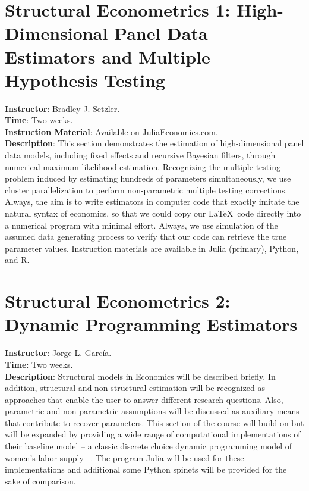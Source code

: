 \section{Structural Econometrics 1: High-Dimensional Panel Data Estimators and Multiple Hypothesis Testing}
\noindent \textbf{Instructor}: Bradley J. Setzler.\\
\noindent \textbf{Time}: Two weeks.\\
\noindent \textbf{Instruction Material}: Available on JuliaEconomics.com.\\
\noindent \textbf{Description}: This section demonstrates the estimation of high-dimensional panel data models, including fixed effects and recursive Bayesian filters, through numerical maximum likelihood estimation. Recognizing the multiple testing problem induced by estimating hundreds of parameters simultaneously, we use cluster parallelization to perform non-parametric multiple testing corrections. Always, the aim is to write estimators in computer code that exactly imitate the natural syntax of economics, so that we could copy our \LaTeX\ code directly into a numerical program with minimal effort. Always, we use simulation of the assumed data generating process to verify that our code can retrieve the true parameter values. Instruction materials are available in Julia (primary), Python, and R.


\section{Structural Econometrics 2: Dynamic Programming Estimators}
\noindent \textbf{Instructor}: Jorge L. Garc\'{i}a.\\
\noindent \textbf{Time}: Two weeks.\\
\noindent \textbf{Description}:  Structural models in Economics will be described briefly. In addition, structural and non-structural estimation will be recognized as approaches that enable the user to answer different research questions. Also, parametric and non-parametric assumptions will be discussed as auxiliary means that contribute to recover parameters. This section of the course will build on \citet{keane2011structural} but will be expanded by providing a wide range of computational implementations of their baseline model – a classic discrete choice dynamic programming model of women's labor supply –. The program Julia will be used for these implementations and additional some Python spinets will be provided for the sake of comparison.

\clearpage


\clearpage

